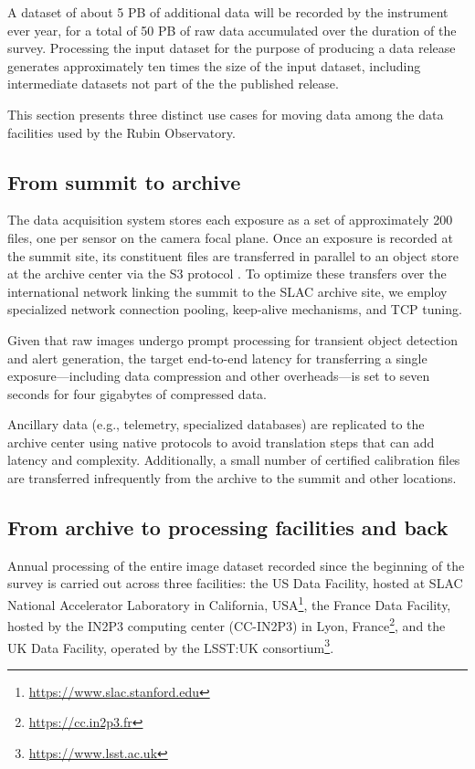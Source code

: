\documentclass{webofc}
\begin{document}
A dataset of about 5 PB of additional data will be recorded by the instrument ever year, for a total of 50 PB of raw data accumulated over the duration of the survey. Processing the input dataset for the purpose of producing a data release generates approximately ten times the size of the input dataset, including intermediate datasets not part of the the published release.

This section presents three distinct use cases for moving data among the data facilities used by the Rubin Observatory.

\subsection{From summit to archive}
\label{summit-to-archive}

The data acquisition system stores each exposure as a set of approximately 200 files, one per sensor on the camera focal plane. Once an exposure is recorded at the summit site, its constituent files are transferred in parallel to an object store at the archive center via the S3 protocol \cite{s3}. To optimize these transfers over the international network linking the summit to the SLAC archive site, we employ specialized network connection pooling, keep-alive mechanisms, and TCP tuning.

Given that raw images undergo prompt processing for transient object detection and alert generation, the target end-to-end latency for transferring a single exposure—including data compression and other overheads—is set to seven seconds for four gigabytes of compressed data.

Ancillary data (e.g., telemetry, specialized databases) are replicated to the archive center using native protocols to avoid translation steps that can add latency and complexity. Additionally, a small number of certified calibration files are transferred infrequently from the archive to the summit and other locations.

\subsection{From archive to processing facilities and back}
\label{summit-to-data-facilities}

Annual processing of the entire image dataset recorded since the beginning of the survey is carried out across three facilities: the US Data Facility, hosted at SLAC National Accelerator Laboratory in California, USA\footnote{\url{https://www.slac.stanford.edu}}, the France Data Facility, hosted by the IN2P3 computing center (CC-IN2P3) in Lyon, France\footnote{\url{https://cc.in2p3.fr}}, and the UK Data Facility, operated by the LSST:UK consortium\footnote{\url{https://www.lsst.ac.uk}}.
\end{document}
